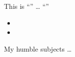 \documentclass{article}
\begin{document}
This is ``\tnss'' \ldots{}
``\tnss''

\begin{itemize}
\item {}
\item {}
\end{itemize}

\begin{king}
My humble subjects \ldots
\end{king}
\end{document}
